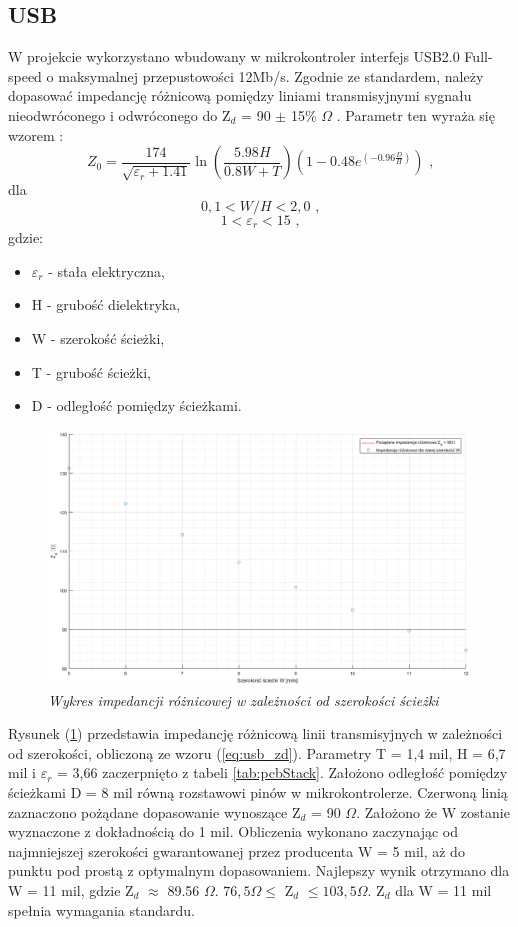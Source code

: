 \documentclass[eng,printmode]{mgr}
\begin{document}
\subsection*{USB}
W projekcie wykorzystano wbudowany w mikrokontroler interfejs USB2.0 Full-speed o maksymalnej przepustowości 12Mb/s. Zgodnie ze standardem, należy dopasować impedancję różnicową pomiędzy liniami transmisyjnymi sygnału nieodwróconego i odwróconego do Z$_d$ = 90 $\pm$ 15\% $\Omega$ \cite{usbSpec}. Parametr ten wyraża się wzorem \cite{highSpeedDesign}:
\begin{equation}
Z_0= \frac{174}{\sqrt{\varepsilon_r + 1.41}}\ln{\left(\frac{5.98H}{0.8W + T}\right)} \left(1-0.48e^{(-0.96\frac{D}{H})}\right) \textrm{ ,} \label{eq:usb_zd} 
\end{equation}
dla
$$
0,1 < W/H < 2,0 \textrm{ ,}
$$
$$
1 < \varepsilon_r < 15 \textrm{ ,}
$$
gdzie:
\begin{itemize}
  \item \textbf{$\varepsilon_r$} - stała elektryczna,
  \item H - grubość dielektryka,
  \item W - szerokość ścieżki,
  \item T - grubość ścieżki,
  \item D - odległość pomiędzy ścieżkami.
\end{itemize}

\begin{figure}[!h]
    \centering
    \includegraphics[width=\textwidth]{plots/usbzD.png}
    \caption{\textit{Wykres impedancji różnicowej w zależności od szerokości ścieżki}}
        \label{fig:usbImp}
\end{figure}

Rysunek (\ref{fig:usbImp}) przedstawia impedancję różnicową linii transmisyjnych w zależności od szerokości, obliczoną ze wzoru (\ref{eq:usb_zd}). Parametry T = 1,4 mil, H = 6,7 mil i \textbf{$\varepsilon_r$} = 3,66 zaczerpnięto z tabeli \ref{tab:pcbStack}. Założono odległość pomiędzy ścieżkami D = 8 mil równą rozstawowi pinów w mikrokontrolerze. Czerwoną linią zaznaczono pożądane dopasowanie wynoszące Z$_d$ = 90 $\Omega$. Założono że W zostanie wyznaczone z dokładnością do 1 mil. Obliczenia wykonano zaczynając od najmniejszej szerokości gwarantowanej przez producenta W = 5 mil, aż do punktu pod prostą z optymalnym dopasowaniem. Najlepszy wynik otrzymano dla W = 11 mil, gdzie Z$_d$ $\approx$ 89.56 $\Omega$. $ 76,5\Omega \leq$ Z$_d$ $\leq 103,5\Omega$. Z$_d$ dla W = 11 mil spełnia wymagania standardu.
\end{document}
